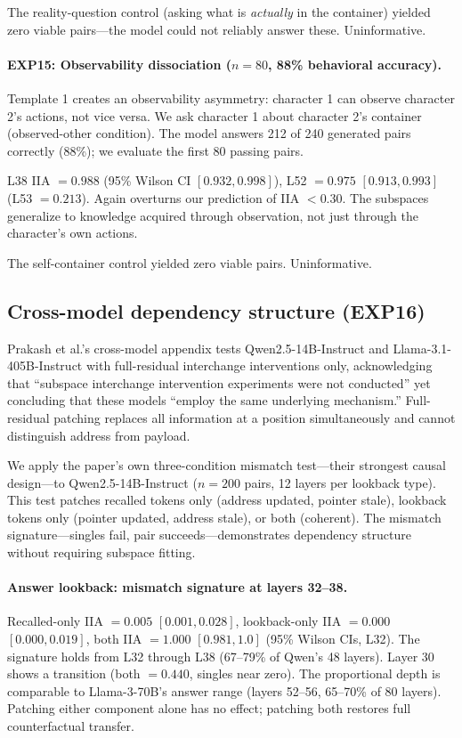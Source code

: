 \documentclass{article}
\begin{document}
The reality-question control (asking what is \emph{actually} in the container) yielded zero viable pairs---the model could not reliably answer these. Uninformative.

\paragraph{EXP15: Observability dissociation ($n = 80$, 88\% behavioral accuracy).}
Template 1 creates an observability asymmetry: character 1 can observe character 2's actions, not vice versa. We ask character 1 about character 2's container (observed-other condition). The model answers 212 of 240 generated pairs correctly (88\%); we evaluate the first 80 passing pairs.

L38 IIA $= 0.988$ (95\% Wilson CI $[0.932, 0.998]$), L52 $= 0.975$ $[0.913, 0.993]$ (L53 $= 0.213$). Again overturns our prediction of IIA $< 0.30$. The subspaces generalize to knowledge acquired through observation, not just through the character's own actions.

The self-container control yielded zero viable pairs. Uninformative.

\subsection{Cross-model dependency structure (EXP16)}
\label{sec:crossmodel}

Prakash et al.'s cross-model appendix tests Qwen2.5-14B-Instruct and Llama-3.1-405B-Instruct with full-residual interchange interventions only, acknowledging that ``subspace interchange intervention experiments were not conducted'' yet concluding that these models ``employ the same underlying mechanism.'' Full-residual patching replaces all information at a position simultaneously and cannot distinguish address from payload.

We apply the paper's own three-condition mismatch test---their strongest causal design---to Qwen2.5-14B-Instruct ($n = 200$ pairs, 12 layers per lookback type). This test patches recalled tokens only (address updated, pointer stale), lookback tokens only (pointer updated, address stale), or both (coherent). The mismatch signature---singles fail, pair succeeds---demonstrates dependency structure without requiring subspace fitting.

\paragraph{Answer lookback: mismatch signature at layers 32--38.}
Recalled-only IIA $= 0.005$ $[0.001, 0.028]$, lookback-only IIA $= 0.000$ $[0.000, 0.019]$, both IIA $= 1.000$ $[0.981, 1.0]$ (95\% Wilson CIs, L32). The signature holds from L32 through L38 (67--79\% of Qwen's 48 layers). Layer 30 shows a transition (both $= 0.440$, singles near zero). The proportional depth is comparable to Llama-3-70B's answer range (layers 52--56, 65--70\% of 80 layers). Patching either component alone has no effect; patching both restores full counterfactual transfer.
\end{document}
